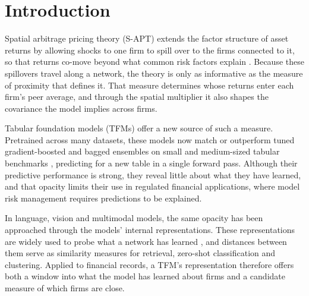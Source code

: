 \section{Introduction}

Spatial arbitrage pricing theory (S-APT) extends the factor structure of
asset returns by allowing shocks to one firm to spill over to the firms
connected to it, so that returns co-move beyond what common risk factors
explain \citep{kou2018}. Because these spillovers travel along a network,
the theory is only as informative as the measure of proximity that defines
it. That measure determines whose returns enter each firm's peer average,
and through the spatial multiplier it also shapes the covariance the model
implies across firms.

Tabular foundation models (TFMs) offer a new source of such a measure.
Pretrained across many datasets, these models now match or outperform tuned
gradient-boosted and bagged ensembles on small and medium-sized tabular
benchmarks \citep{hollmann2025,ye2025}, predicting for a new table in a
single forward pass. Although their predictive performance is strong, they
reveal little about what they have learned, and that opacity limits their
use in regulated financial applications, where model risk management
requires predictions to be explained.

In language, vision and multimodal models, the same opacity has been
approached through the models' internal representations. These
representations are widely used to probe what a network has learned
\citep{kornblith2019,huh2024}, and distances between them serve as
similarity measures for retrieval, zero-shot classification and clustering.
Applied to financial records, a TFM's representation therefore offers both
a window into what the model has learned about firms and a candidate
measure of which firms are close.


